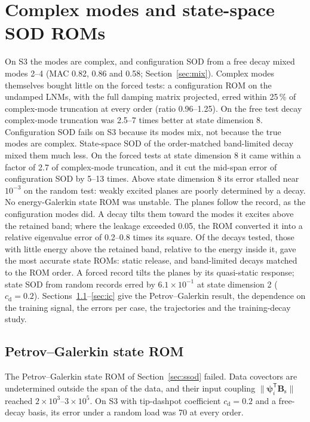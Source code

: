 \documentclass[11pt]{article}
\begin{document}
\section{Complex modes and state-space SOD ROMs}\label{sec:complex}
On S3 the modes are complex, and configuration SOD from a free decay mixed modes 2--4 (MAC 0.82, 0.86 and 0.58; Section~\ref{sec:mix}). Complex modes themselves bought little on the forced tests: a configuration ROM on the undamped LNMs, with the full damping matrix projected, erred within 25\,\% of complex-mode truncation at every order (ratio 0.96--1.25). On the free test decay complex-mode truncation was 2.5--7 times better at state dimension 8. Configuration SOD fails on S3 because its modes mix, not because the true modes are complex.
State-space SOD of the order-matched band-limited decay mixed them much less. On the forced tests at state dimension 8 it came within a factor of 2.7 of complex-mode truncation, and it cut the mid-span error of configuration SOD by 5--13 times. Above state dimension 8 its error stalled near $10^{-3}$ on the random test: weakly excited planes are poorly determined by a decay. No energy-Galerkin state ROM was unstable.
The planes follow the record, as the configuration modes did. A decay tilts them toward the modes it excites above the retained band; where the leakage exceeded 0.05, the ROM converted it into a relative eigenvalue error of 0.2--0.8 times its square. Of the decays tested, those with little energy above the retained band, relative to the energy inside it, gave the most accurate state ROMs: static release, and band-limited decays matched to the ROM order. A forced record tilts the planes by its quasi-static response; state SOD from random records erred by $6.1\times10^{-1}$ at state dimension 2 ($c_{\mathrm d}=0.2$). Sections~\ref{sec:s-pg}--\ref{sec:ic} give the Petrov--Galerkin result, the dependence on the training signal, the errors per case, the trajectories and the training-decay study.

\subsection{Petrov--Galerkin state ROM}\label{sec:s-pg}
The Petrov--Galerkin state ROM of Section~\ref{sec:ssod} failed. Data covectors are undetermined outside the span of the data, and their input coupling $\|\bm{\psi}_i^{\mathsf T}\bm{B}_{\mathrm s}\|$ reached $2\times10^3$--$3\times10^5$. On S3 with tip-dashpot coefficient $c_{\mathrm d}=0.2$ and a free-decay basis, its error under a random load was 70 at every order.
\end{document}
